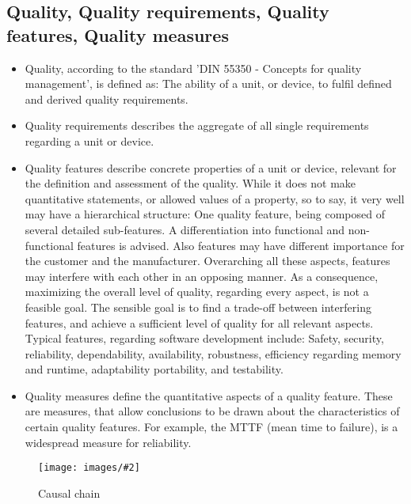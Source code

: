 \documentclass[master,english,smartquotes,apa]{hgbthesis}
\newcommand \bildGr[5]{\begin{figure}[#1]	\centering	\texttt{[image: images/\#2]}	\caption{#3}	\label{#4}	\end{figure}}
\begin{document}
	\subsection{Quality, Quality requirements, Quality features, Quality measures}
		\begin{itemize}
		\item Quality, according to the standard 'DIN 55350 - Concepts for quality management', is defined as: The ability of a unit, or device, to fulfil defined and derived quality requirements.
		\item Quality requirements describes the aggregate of all single requirements regarding a unit or device.
		\item Quality features describe concrete properties of a unit or device, relevant for the definition and assessment of the quality. While it does not make quantitative statements, or allowed values of a property, so to say, it very well may have a hierarchical structure: One quality feature, being composed of several detailed sub-features. A differentiation into functional and non-functional features is advised. Also features may have different importance for the customer and the manufacturer. Overarching all these aspects, features may interfere with each other in an opposing manner. As a consequence, maximizing the overall level of quality, regarding every aspect, is not a feasible goal. The sensible goal is to find a trade-off between interfering features, and achieve a sufficient level of quality for all relevant aspects. Typical features, regarding software development include: Safety, security, reliability, dependability, availability, robustness, efficiency regarding memory and runtime, adaptability portability, and testability.
		\item {Quality measures} define the quantitative aspects of a quality feature. These are measures, that allow conclusions to be drawn about the characteristics of certain quality features. For example, the MTTF (mean time to failure), is a widespread measure for reliability.
		\end{itemize}
	
	\bildGr{b!}{ErrorFaultFailure.pdf}{Causal chain}{ErrorFaultFailure}{0.5\textwidth}
\end{document}
